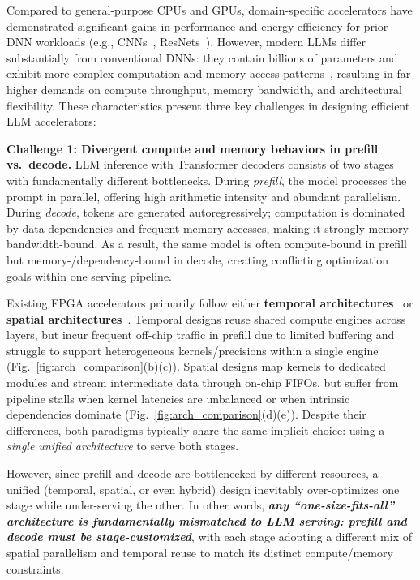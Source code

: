 \documentclass[conference]{IEEEtran}
\begin{document}
Compared to general-purpose CPUs and GPUs, domain-specific accelerators have demonstrated significant gains in performance and energy efficiency for prior DNN workloads (e.g., CNNs~\cite{zhang2016caffeine, basalama2023flexcnn}, ResNets~\cite{li2017fpga, ma2017end, guan2017fp}). However, modern LLMs differ substantially from conventional DNNs: they contain billions of parameters and exhibit more complex computation and memory access patterns~\cite{brown2020gpt3, dubey2024llama, liu2024deepseek}, resulting in far higher demands on compute throughput, memory bandwidth, and architectural flexibility. These characteristics present three key challenges in designing efficient LLM accelerators:

\textbf{Challenge 1: Divergent compute and memory behaviors in prefill vs.\ decode.}  
LLM inference with Transformer decoders consists of two stages with fundamentally different bottlenecks. During \emph{prefill}, the model processes the prompt in parallel, offering high arithmetic intensity and abundant parallelism. During \emph{decode}, tokens are generated autoregressively; computation is dominated by data dependencies and frequent memory accesses, making it strongly memory-bandwidth-bound. As a result, the same model is often compute-bound in prefill but memory-/dependency-bound in decode, creating conflicting optimization goals within one serving pipeline.

Existing FPGA accelerators primarily follow either \textbf{temporal architectures}~\cite{hong2022dfx, zeng2024flightllm} or \textbf{spatial architectures}~\cite{blott2018finn, fastml_hls4ml, chen2024allo, ye2025streamtensor}. Temporal designs reuse shared compute engines across layers, but incur frequent off-chip traffic in prefill due to limited buffering and struggle to support heterogeneous kernels/precisions within a single engine (Fig.~\ref{fig:arch_comparison}(b)(c)). Spatial designs map kernels to dedicated modules and stream intermediate data through on-chip FIFOs, but suffer from pipeline stalls when kernel latencies are unbalanced or when intrinsic dependencies dominate (Fig.~\ref{fig:arch_comparison}(d)(e)). Despite their differences, both paradigms typically share the same implicit choice: using a \emph{single unified architecture} to serve both stages.

However, since prefill and decode are bottlenecked by different resources, a unified (temporal, spatial, or even hybrid) design inevitably over-optimizes one stage while under-serving the other. In other words, \textbf{\textit{any ``one-size-fits-all'' architecture is fundamentally mismatched to LLM serving: prefill and decode must be stage-customized}}, with each stage adopting a different mix of spatial parallelism and temporal reuse to match its distinct compute/memory constraints.
\end{document}
